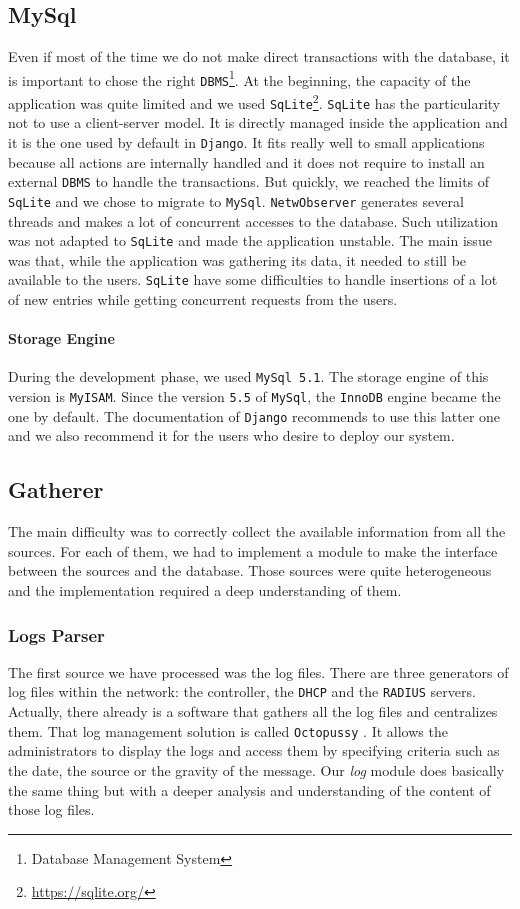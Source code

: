 \subsection{MySql}
Even if most of the time we do not make direct transactions with the database, it is important to chose the right \texttt{DBMS}\footnote{Database Management System}. At the beginning, the capacity of the application was quite limited and we used \texttt{SqLite}\footnote{\url{https://sqlite.org/}}. \texttt{SqLite} has the particularity not to use a client-server model. It is directly managed inside the application and it is the one used by default in \texttt{Django}. It fits really well to small applications because all actions are internally handled and it does not require to install an external \texttt{DBMS} to handle the transactions. But quickly, we reached the limits of \texttt{SqLite} and we chose to migrate to \texttt{MySql}. \texttt{NetwObserver} generates several threads and makes a lot of concurrent accesses to the database. Such utilization was not adapted to \texttt{SqLite} and made the application unstable. The main issue was that, while the application was gathering its data, it needed to still be available to the users. \texttt{SqLite} have some difficulties to handle insertions of a lot of new entries while getting concurrent requests from the users.


\paragraph*{Storage Engine} During the development phase, we used \texttt{MySql 5.1}. The storage engine of this version is \texttt{MyISAM}. Since the version \texttt{5.5} of \texttt{MySql}, the \texttt{InnoDB} engine became the one by default. The documentation of \texttt{Django} recommends to use this latter one and we also recommend it for the users who desire to deploy our system.

\subsection{Gatherer}
The main difficulty was to correctly collect the available information from all the sources. For each of them, we had to implement a module to make the interface between the sources and the database. Those sources were quite heterogeneous and the implementation required a deep understanding of them. 

\subsubsection{Logs Parser}
The first source we have processed was the log files. There are three generators of log files within the network: the controller, the \texttt{DHCP} and the \texttt{RADIUS} servers. Actually, there already is a software that gathers all the log files and centralizes them. That log management solution is called \texttt{Octopussy} \cite{octopussy}. It allows the administrators to display the logs and access them by specifying criteria such as the date, the source or the gravity of the message. Our \emph{log} module does basically the same thing but with a deeper analysis and understanding of the content of those log files. 
